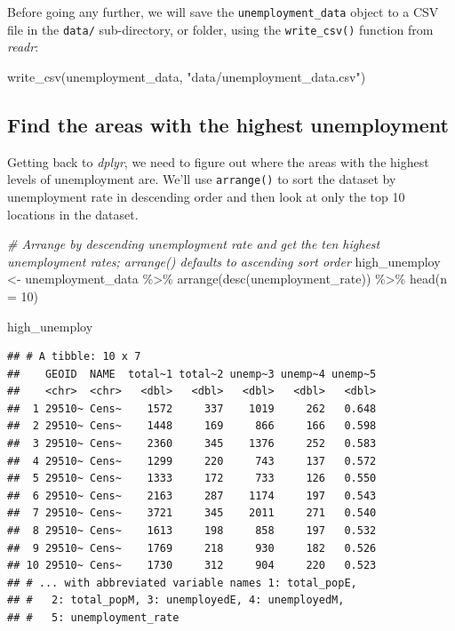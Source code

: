 \documentclass[
  krantz2]{krantz}
\makeatletter
\newenvironment{Shaded}{\begin{snugshade}}{\end{snugshade}}
\newcommand{\AttributeTok}[1]{\textcolor[rgb]{0.61,0.61,0.61}{#1}}
\newcommand{\CommentTok}[1]{\textcolor[rgb]{0.37,0.37,0.37}{\textit{#1}}}
\newcommand{\DecValTok}[1]{\textcolor[rgb]{0.06,0.06,0.06}{#1}}
\newcommand{\FunctionTok}[1]{\textcolor[rgb]{0,0,0}{#1}}
\newcommand{\NormalTok}[1]{#1}
\newcommand{\OtherTok}[1]{\textcolor[rgb]{0.37,0.37,0.37}{#1}}
\newcommand{\SpecialCharTok}[1]{\textcolor[rgb]{0,0,0}{#1}}
\newcommand{\StringTok}[1]{\textcolor[rgb]{0.5,0.5,0.5}{#1}}
\newenvironment{kframe}{%
\medskip{}
\setlength{\fboxsep}{.8em}
 \def\at@end@of@kframe{}%
 \ifinner\ifhmode%
  \def\at@end@of@kframe{\end{minipage}}%
  \begin{minipage}{\columnwidth}%
 \fi\fi%
 \def\FrameCommand##1{\hskip\@totalleftmargin \hskip-\fboxsep
 \colorbox{shadecolor}{##1}\hskip-\fboxsep
     \hskip-\linewidth \hskip-\@totalleftmargin \hskip\columnwidth}%
 \MakeFramed {\advance\hsize-\width
   \@totalleftmargin\z@ \linewidth\hsize
   \@setminipage}}%
 {\par\unskip\endMakeFramed%
 \at@end@of@kframe}
\renewenvironment{Shaded}{\begin{kframe}}{\end{kframe}}
\makeatother
\begin{document}
Before going any further, we will save the \texttt{unemployment\_data} object to a CSV file in the \texttt{data/} sub-directory, or folder, using the \texttt{write\_csv()} function from \emph{readr}:

\begin{Shaded}
\begin{Highlighting}[]
\FunctionTok{write\_csv}\NormalTok{(unemployment\_data, }\StringTok{"data/unemployment\_data.csv"}\NormalTok{) }
\end{Highlighting}
\end{Shaded}

\hypertarget{find-the-areas-with-the-highest-unemployment}{%
\subsection{Find the areas with the highest unemployment}\label{find-the-areas-with-the-highest-unemployment}}

Getting back to \emph{dplyr}, we need to figure out where the areas with the highest levels of unemployment are. We'll use \texttt{arrange()} to sort the dataset by unemployment rate in descending order and then look at only the top 10 locations in the dataset.

\begin{Shaded}
\begin{Highlighting}[]
\CommentTok{\# Arrange by descending unemployment rate and get the ten highest unemployment rates; \textasciigrave{}arrange()\textasciigrave{} defaults to ascending sort order}
\NormalTok{high\_unemploy }\OtherTok{\textless{}{-}}\NormalTok{ unemployment\_data }\SpecialCharTok{\%\textgreater{}\%}
  \FunctionTok{arrange}\NormalTok{(}\FunctionTok{desc}\NormalTok{(unemployment\_rate)) }\SpecialCharTok{\%\textgreater{}\%}
  \FunctionTok{head}\NormalTok{(}\AttributeTok{n =} \DecValTok{10}\NormalTok{)}

\NormalTok{high\_unemploy}
\end{Highlighting}
\end{Shaded}

\begin{verbatim}
## # A tibble: 10 x 7
##    GEOID  NAME  total~1 total~2 unemp~3 unemp~4 unemp~5
##    <chr>  <chr>   <dbl>   <dbl>   <dbl>   <dbl>   <dbl>
##  1 29510~ Cens~    1572     337    1019     262   0.648
##  2 29510~ Cens~    1448     169     866     166   0.598
##  3 29510~ Cens~    2360     345    1376     252   0.583
##  4 29510~ Cens~    1299     220     743     137   0.572
##  5 29510~ Cens~    1333     172     733     126   0.550
##  6 29510~ Cens~    2163     287    1174     197   0.543
##  7 29510~ Cens~    3721     345    2011     271   0.540
##  8 29510~ Cens~    1613     198     858     197   0.532
##  9 29510~ Cens~    1769     218     930     182   0.526
## 10 29510~ Cens~    1730     312     904     220   0.523
## # ... with abbreviated variable names 1: total_popE,
## #   2: total_popM, 3: unemployedE, 4: unemployedM,
## #   5: unemployment_rate
\end{verbatim}
\end{document}
